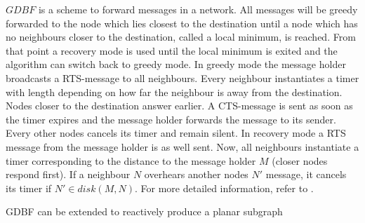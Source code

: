 $GDBF $ is a scheme to forward messages in a network.
All messages will be greedy forwarded to the node which lies closest to the destination until a node which has no neighbours closer to the destination, called a local minimum, is reached.
From that point a recovery mode is used until the local minimum is exited and the algorithm can switch back to greedy mode.
In greedy mode the message holder broadcasts a RTS-message to all neighbours.
Every neighbour instantiates a timer with length depending on how far the neighbour is away from the destination. 
Nodes closer to the destination answer earlier.
A CTS-message is sent as soon as the timer expires and the message holder forwards the message to its sender. 
Every other nodes cancels its timer and remain silent.
In recovery mode a RTS message from the message holder is as well sent.
Now, all neighbours instantiate a timer corresponding to the distance to the message holder $M $ (closer nodes respond first).
If a neighbour $N $ overhears another nodes $N' $ message, it cancels its timer if $N' \in disk(M, N) $.
For more detailed information, refer to \cite{Chawla2006}.

GDBF can be extended to reactively produce a planar subgraph 




